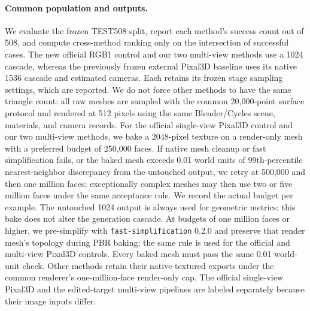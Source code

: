 \paragraph{Common population and outputs.}
We evaluate the frozen TEST508 split, report each method's success count out
of 508, and compute cross-method ranking only on the intersection of
successful cases. The new official RGB1 control and our two multi-view
methods use a 1024 cascade, whereas the previously frozen external Pixal3D
baseline uses its native 1536 cascade and estimated cameras. Each retains its
frozen stage sampling settings, which are reported. We do not force other methods to have the same
triangle count: all raw meshes are sampled with the common 20,000-point
surface protocol and rendered at 512 pixels using the same Blender/Cycles
scene, materials, and camera records. For the official single-view Pixal3D
control and our two multi-view methods, we bake a 2048-pixel texture on a
render-only mesh with a preferred budget of 250,000 faces. If native mesh
cleanup or fast simplification fails, or the baked mesh exceeds
0.01 world units of 99th-percentile nearest-neighbor discrepancy from the
untouched output, we retry at 500,000 and then one million faces;
exceptionally complex meshes may then use two or five million faces under the
same acceptance rule. We record the
actual budget per example. The untouched 1024
output is always used for geometric metrics; this bake does not alter the
generation cascade. At budgets of one million faces or higher, we pre-simplify with
\texttt{fast-simplification} 0.2.0 and preserve that render mesh's topology
during PBR baking; the same rule is used for the official and multi-view
Pixal3D controls. Every baked mesh must pass the same 0.01 world-unit check.
Other methods retain their native textured exports under
the common renderer's one-million-face render-only cap. The official
single-view Pixal3D and
the edited-target multi-view pipelines are labeled separately because their
image inputs differ.

